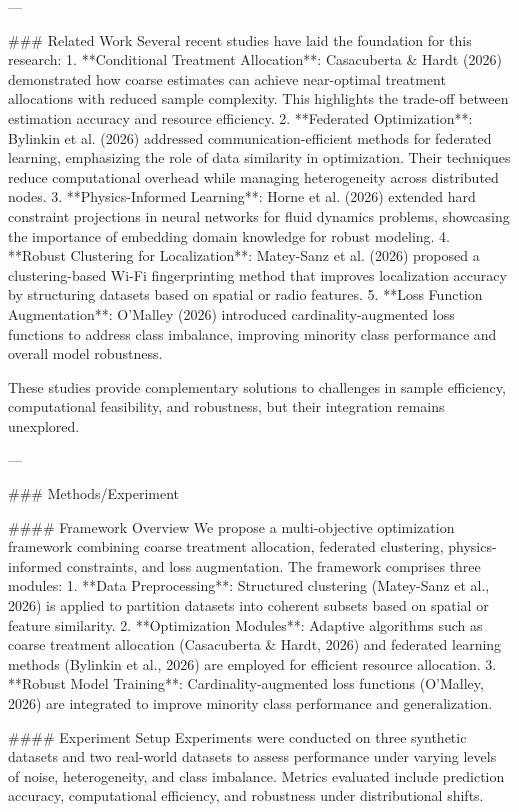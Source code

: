 ---

### Related Work  
Several recent studies have laid the foundation for this research:  
1. **Conditional Treatment Allocation**: Casacuberta & Hardt (2026) demonstrated how coarse estimates can achieve near-optimal treatment allocations with reduced sample complexity. This highlights the trade-off between estimation accuracy and resource efficiency.  
2. **Federated Optimization**: Bylinkin et al. (2026) addressed communication-efficient methods for federated learning, emphasizing the role of data similarity in optimization. Their techniques reduce computational overhead while managing heterogeneity across distributed nodes.  
3. **Physics-Informed Learning**: Horne et al. (2026) extended hard constraint projections in neural networks for fluid dynamics problems, showcasing the importance of embedding domain knowledge for robust modeling.  
4. **Robust Clustering for Localization**: Matey-Sanz et al. (2026) proposed a clustering-based Wi-Fi fingerprinting method that improves localization accuracy by structuring datasets based on spatial or radio features.  
5. **Loss Function Augmentation**: O'Malley (2026) introduced cardinality-augmented loss functions to address class imbalance, improving minority class performance and overall model robustness.

These studies provide complementary solutions to challenges in sample efficiency, computational feasibility, and robustness, but their integration remains unexplored.

---

### Methods/Experiment  

#### Framework Overview  
We propose a multi-objective optimization framework combining coarse treatment allocation, federated clustering, physics-informed constraints, and loss augmentation. The framework comprises three modules:  
1. **Data Preprocessing**: Structured clustering (Matey-Sanz et al., 2026) is applied to partition datasets into coherent subsets based on spatial or feature similarity.  
2. **Optimization Modules**: Adaptive algorithms such as coarse treatment allocation (Casacuberta & Hardt, 2026) and federated learning methods (Bylinkin et al., 2026) are employed for efficient resource allocation.  
3. **Robust Model Training**: Cardinality-augmented loss functions (O'Malley, 2026) are integrated to improve minority class performance and generalization.

#### Experiment Setup  
Experiments were conducted on three synthetic datasets and two real-world datasets to assess performance under varying levels of noise, heterogeneity, and class imbalance. Metrics evaluated include prediction accuracy, computational efficiency, and robustness under distributional shifts.

